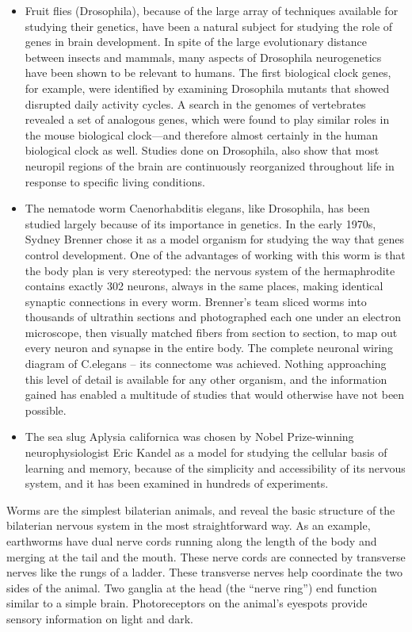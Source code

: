\begin{itemize}
\tightlist
\item
  Fruit flies (Drosophila), because of the large array of techniques available for studying their genetics, have been a natural subject for studying the role of genes in brain development. In spite of the large evolutionary distance between insects and mammals, many aspects of Drosophila neurogenetics have been shown to be relevant to humans. The first biological clock genes, for example, were identified by examining Drosophila mutants that showed disrupted daily activity cycles. A search in the genomes of vertebrates revealed a set of analogous genes, which were found to play similar roles in the mouse biological clock---and therefore almost certainly in the human biological clock as well. Studies done on Drosophila, also show that most neuropil regions of the brain are continuously reorganized throughout life in response to specific living conditions.
\item
  The nematode worm Caenorhabditis elegans, like Drosophila, has been studied largely because of its importance in genetics. In the early 1970s, Sydney Brenner chose it as a model organism for studying the way that genes control development. One of the advantages of working with this worm is that the body plan is very stereotyped: the nervous system of the hermaphrodite contains exactly 302 neurons, always in the same places, making identical synaptic connections in every worm. Brenner's team sliced worms into thousands of ultrathin sections and photographed each one under an electron microscope, then visually matched fibers from section to section, to map out every neuron and synapse in the entire body. The complete neuronal wiring diagram of C.elegans -- its connectome was achieved. Nothing approaching this level of detail is available for any other organism, and the information gained has enabled a multitude of studies that would otherwise have not been possible.
\item
  The sea slug Aplysia californica was chosen by Nobel Prize-winning neurophysiologist Eric Kandel as a model for studying the cellular basis of learning and memory, because of the simplicity and accessibility of its nervous system, and it has been examined in hundreds of experiments.
\end{itemize}

Worms are the simplest bilaterian animals, and reveal the basic structure of the bilaterian nervous system in the most straightforward way. As an example, earthworms have dual nerve cords running along the length of the body and merging at the tail and the mouth. These nerve cords are connected by transverse nerves like the rungs of a ladder. These transverse nerves help coordinate the two sides of the animal. Two ganglia at the head (the ``nerve ring'') end function similar to a simple brain. Photoreceptors on the animal's eyespots provide sensory information on light and dark.

